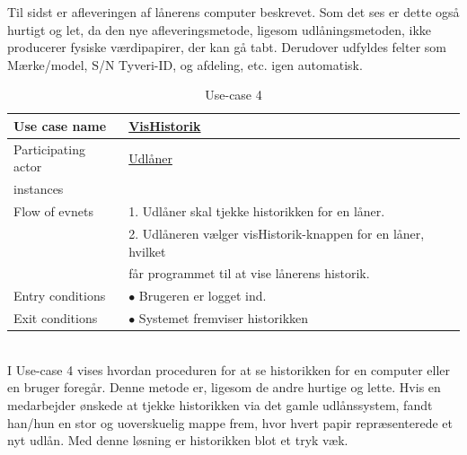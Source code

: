 \documentclass[a4paper]{article}
\begin{document}
Til sidst er afleveringen af lånerens computer beskrevet. Som det ses er dette også hurtigt og let, da den nye afleveringsmetode, ligesom udlåningsmetoden, ikke producerer fysiske værdipapirer, der kan gå tabt. Derudover udfyldes felter som Mærke/model, S/N Tyveri-ID, og afdeling, etc. igen automatisk. \\
\begin{table}[h]
\caption{Use-case 4}
\begin{tabular}{ll}
Use case name               & \underline{VisHistorik} \\ \hline
Participating actor           & \underline{Udlåner} \\
instances\\ \hline
Flow of evnets                & 1. Udlåner skal tjekke historikken for en låner.
                            \\& 2. Udlåneren vælger visHistorik-knappen for en låner, hvilket
                            \\& får programmet til at vise lånerens historik.  \\ \hline
Entry conditions & $\bullet$ Brugeren er logget ind. \\ \hline
Exit conditions  & $\bullet$ Systemet fremviser historikken
\end{tabular}
\end{table}\\
I Use-case 4 vises hvordan proceduren for at se historikken for en computer eller en bruger foregår. Denne metode er, ligesom de andre hurtige og lette. Hvis en medarbejder ønskede at tjekke historikken via det gamle udlånssystem, fandt han/hun en stor og uoverskuelig mappe frem, hvor hvert papir repræsenterede et nyt udlån. Med denne løsning er historikken blot et tryk væk.
\newpage
\end{document}
